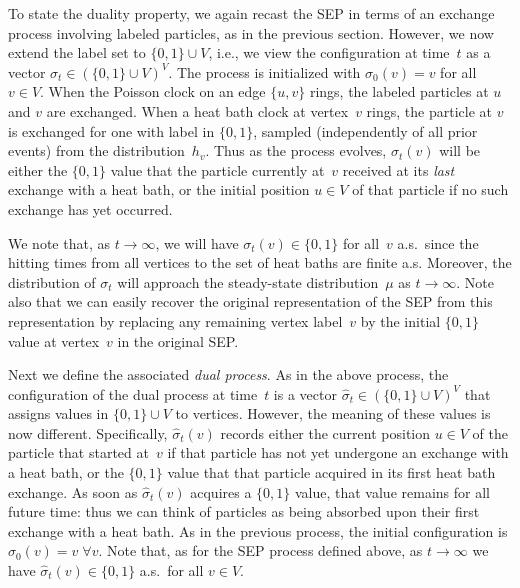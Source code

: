 \documentclass[11pt]{article}
\theoremstyle{plain}
\theoremstyle{definition}
\theoremstyle{remark}
\numberwithin{equation}{section}
\begin{document}
To state the duality property, we again recast the SEP in terms of an exchange process
involving labeled particles, as in the previous section.  However, we now extend the label
set to $\{0,1\}\cup V$, i.e., we view the configuration at time~$t$ as a vector 
$\sigma_t\in (\{0,1\}\cup V)^V$.  The process is initialized with $\sigma_0(v)=v$ for all $v\in V$.
When the Poisson clock on an edge $\{u,v\}$ rings, the labeled particles at $u$ and $v$ are exchanged.  
When a heat bath clock at vertex~$v$ rings, the particle at $v$ is exchanged for one with 
label in $\{0,1\}$, sampled (independently of all prior events) from the distribution~$h_v$.
Thus as the process evolves, $\sigma_t(v)$ will be either the $\{0,1\}$ value that the particle
currently at~$v$ received at its {\it last\/} exchange with a heat bath, or 
the initial position $u\in V$ of that particle if no such exchange has yet occurred.

We note that, as $t\to\infty$, we will have $\sigma_t(v)\in \{0,1\}$ for
all~$v$ a.s.\ since the hitting times from all vertices to the set of heat baths
are finite a.s. Moreover, the distribution of $\sigma_t$ will approach the steady-state
distribution~$\mu$ as $t\to\infty$.
Note also that we can easily recover the original representation of the SEP from this
representation by replacing any remaining vertex label~$v$ by the initial
$\{0,1\}$ value at vertex~$v$ in the original SEP.

Next we define the associated {\it dual process}.  
As in the above process, the configuration of the dual process at time~$t$ is
a vector $\hat\sigma_t \in (\{0,1\}\cup V)^V$ that assigns values in
$\{0,1\}\cup V$ to vertices.  However, the meaning of these values is
now different.  Specifically, $\hat\sigma_t(v)$ records either the current position $u\in V$
of the particle that started at~$v$ if that particle has not yet undergone
an exchange with a heat bath, or the $\{0,1\}$ value that that particle 
acquired in its first heat bath exchange.  
As soon as $\hat\sigma_t(v)$ acquires a $\{0,1\}$ value, that value remains
for all future time: thus we can think of particles as being absorbed upon their
first exchange with a heat bath.  As in the previous process,
the initial configuration is $\hat\sigma_0(v)=v\;\forall v$.
Note that, as for the SEP process defined above, as $t\to\infty$ we have 
$\hat\sigma_t(v)\in \{0,1\}$ a.s.\ for all $v\in V$.
\end{document}

